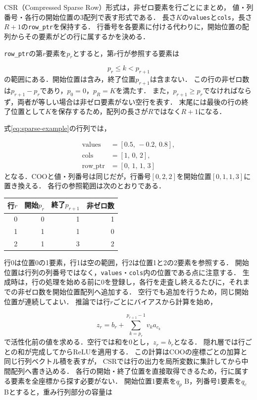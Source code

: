 \documentclass[a4paper,11pt]{article}
\newcommand{\code}[1]{\nolinkurl{#1}}
\begin{document}
CSR（Compressed Sparse Row）形式は，非ゼロ要素を行ごとにまとめ，
値・列番号・各行の開始位置の3配列で表す形式である\cite{csr}．
長さ$K$の\code{values}と\code{cols}，長さ$R+1$の\code{row_ptr}を保持する．
行番号を各要素に付ける代わりに，開始位置の配列からその要素がどの行に属するかを決める．

\code{row_ptr}の第$r$要素を$p_r$とすると，第$r$行が参照する要素は

\[
    p_r\leq k<p_{r+1}
\]
%
の範囲にある．開始位置は含み，終了位置$p_{r+1}$は含まない．
この行の非ゼロ数は$p_{r+1}-p_r$であり，$p_0=0$，$p_R=K$を満たす．
また，$p_{r+1}\geq p_r$でなければならず，両者が等しい場合は非ゼロ要素がない空行を表す．
末尾には最後の行の終了位置として$K$を保存するため，配列の長さが$R$ではなく$R+1$になる．

式\eqref{eq:sparse-example}の行列では，

\[
    \begin{aligned}
        \text{values}&=[0.5,\,-0.2,\,0.8],\\
        \text{cols}&=[1,\,0,\,2],\\
        \text{row\_ptr}&=[0,\,1,\,1,\,3]
    \end{aligned}
\]
%
となる．COOと値・列番号は同じだが，行番号$[0,2,2]$を開始位置$[0,1,1,3]$に置き換える．
各行の参照範囲は次のとおりである．

\begin{center}
\small
\begin{tabular}{rrrr}\toprule
行$r$&開始$p_r$&終了$p_{r+1}$&非ゼロ数\\\midrule
0&0&1&1\\\midrule
1&1&1&0\\\midrule
2&1&3&2\\\bottomrule
\end{tabular}
\end{center}
%
行0は位置0の1要素，行1は空の範囲，行2は位置1と2の2要素を参照する．
開始位置は行列の列番号ではなく，\code{values}・\code{cols}内の位置である点に注意する．
生成時は，行の処理を始める前に0を登録し，各行を走査し終えるたびに，それまでの非ゼロ数を開始位置配列へ追加する．
空行でも追加を行うため，同じ開始位置が連続してよい．
推論では行$r$ごとにバイアスから計算を始め，

\[
    z_r=b_r+\sum_{k=p_r}^{p_{r+1}-1}v_k a_{c_k}
\]
%
で活性化前の値を求める．空行では和を0とし，$z_r=b_r$となる．
隠れ層では行ごとの和が完成してからReLUを適用する．
この計算はCOOの座標ごとの加算と同じ行列ベクトル積を表すが，
CSRでは行の出力を局所変数に集計してから中間配列へ書き込める．
各行の開始・終了位置を直接取得できるため，行に属する要素を全座標から探す必要がない．
開始位置1要素を$q_p$ B，列番号1要素を$q_c$ Bとすると，重み行列部分の容量は
\end{document}
